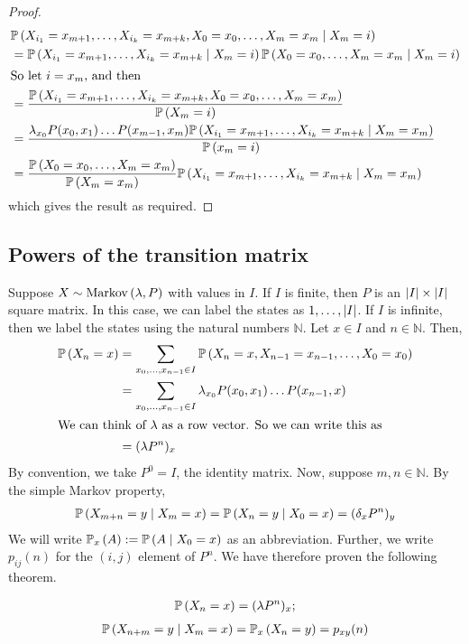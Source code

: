 \begin{proof}
	\begin{align*}
		 & \mathbb{P}\left({X_{i_1} = x_{m+1}, \dots, X_{i_k} = x_{m+k}, X_0 = x_0, \dots, X_m = x_m \mid X_m = i}\right)                                               \\
		 & = \mathbb{P}\left({X_{i_1} = x_{m+1}, \dots, X_{i_k} = x_{m+k} \mid X_m = i}\right) \mathbb{P}\left({X_0 = x_0, \dots, X_m = x_m \mid X_m = i}\right)                          \\
		\intertext{So let $i = x_m$, and then}
		 & = \frac{\mathbb{P}\left({X_{i_1} = x_{m+1}, \dots, X_{i_k} = x_{m+k}, X_0 = x_0, \dots, X_m = x_m}\right)}{\mathbb{P}\left({X_m = i}\right)}                                   \\
		 & = \frac{\lambda_{x_0} P(x_0, x_1) \dots P(x_{m-1}, x_m) \mathbb{P}\left({X_{i_1} = x_{m+1}, \dots, X_{i_k} = x_{m+k} \mid X_m = x_m}\right)}{\mathbb{P}\left({x_m = i}\right)} \\
		 & = \frac{\mathbb{P}\left({X_0 = x_0, \dots, X_m = x_m}\right)}{\mathbb{P}\left({X_m = x_m}\right)} \mathbb{P}\left({X_{i_1} = x_{m+1}, \dots, X_{i_k} = x_{m+k} \mid X_m = x_m}\right)
	\end{align*}
	which gives the result as required.
\end{proof}

\subsection{Powers of the transition matrix}
Suppose $X \sim \operatorname{Markov}\left({\lambda, P}\right)$ with values in $I$.
If $I$ is finite, then $P$ is an $\abs{I} \times \abs{I}$ square matrix.
In this case, we can label the states as $1, \dots, \abs{I}$.
If $I$ is infinite, then we label the states using the natural numbers $\mathbb N$.
Let $x \in I$ and $n \in \mathbb N$.
Then,
\begin{align*}
	\mathbb{P}\left({X_n = x}\right) & = \sum_{x_0, \dots, x_{n-1} \in I} \mathbb{P}\left({X_n = x, X_{n-1} = x_{n-1}, \dots, X_0 = x_0}\right) \\
	               & = \sum_{x_0, \dots, x_{n-1} \in I} \lambda_{x_0} P(x_0, x_1) \dots P(x_{n-1}, x)       \\
	\intertext{We can think of $\lambda$ as a row vector.
		So we can write this as}
	               & = (\lambda P^n)_x
\end{align*}
By convention, we take $P^0 = I$, the identity matrix.
Now, suppose $m, n \in \mathbb N$.
By the simple Markov property,
\begin{align*}
	\mathbb{P}\left({X_{m+n} = y \mid X_m = x}\right) = \mathbb{P}\left({X_n = y \mid X_0 = x}\right) = ( \delta_x P^n )_y
\end{align*}
We will write $\mathbb{P}_{x}\left({A}\right) := \mathbb{P}\left({A \mid X_0 = x}\right)$ as an abbreviation.
Further, we write $p_{ij}(n)$ for the $(i,j)$ element of $P^n$.
We have therefore proven the following theorem.
\begin{theorem}
	\begin{align*}
		\mathbb{P}\left({X_n = x}\right) = (\lambda P^n)_x;
	\end{align*}
	\begin{align*}
		\mathbb{P}\left({X_{n+m} = y \mid X_m = x}\right) = \mathbb{P}_{x}\left({X_n = y}\right) = p_{xy}(n)
	\end{align*}
\end{theorem}

